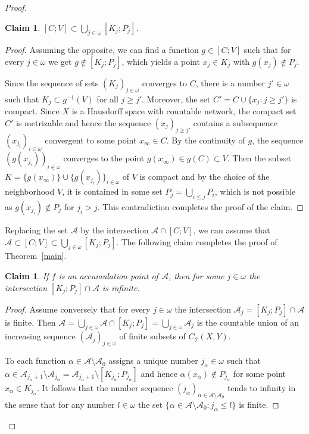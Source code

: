 \documentclass{amsart}
\newtheorem{claim}[theorem]{Claim}
\theoremstyle{definition}
\begin{document}
\begin{proof}
\begin{claim}\label{cl1} $[C;V]\subset \bigcup_{j\in{\omega}}[K_j;P_j]$.
\end{claim}

\begin{proof} Assuming the opposite, we can find a function $g\in [C;V]$ such that for every $j\in{\omega}$ we get $g\notin [K_j;P_j]$, which yields a point $x_j\in K_j$ with $g(x_j)\notin P_j$.

Since the sequence of sets $(K_j)_{j\in{\omega}}$ converges to $C$, there is a number $j'\in{\omega}$ such that $K_j\subset g^{-1}(V)$ for all $j\ge j'$. Moreover, the set $C'=C\cup\{x_j:j\ge j'\}$ is compact. Since $X$ is a Hausdorff space with countable network, the compact set $C'$ is metrizable and hence the sequence $(x_j)_{j\ge j'}$ contains a subsequence $(x_{j_i})_{i\in{\omega}}$ convergent to some point $x_\infty\in C$. By the continuity of $g$, the sequence $(g(x_{j_i}))_{i\in{\omega}}$ converges to the point $g(x_\infty)\in g(C)\subset V$. Then the subset $K=\{g(x_\infty)\}\cup\{g(x_{j_i})\}_{i\in{\omega}}$ of $V$ is compact and by the choice of the neighborhood $V$, it is contained in some set $P_j=\bigcup_{i\le j}P_{i}$, which is not possible as $g(x_{j_i})\notin P_j$ for $j_i>j$. This contradiction completes the proof of the claim.
\end{proof}

Replacing the set ${\mathcal A}$ by the intersection ${\mathcal A}\cap[C;V]$, we can assume that ${\mathcal A}\subset[C;V]\subset\bigcup_{j\in{\omega}}[K_j;P_j]$. The following claim completes the proof of Theorem~\ref{main}.

\begin{claim}\label{cl2} If $f$ is an accumulation point of ${\mathcal A}$, then  for some $j\in{\omega}$ the intersection $[K_j;P_j]\cap {\mathcal A}$ is infinite.
\end{claim}

\begin{proof} Assume conversely that for every $j\in{\omega}$ the intersection ${\mathcal A}_j=[K_j;P_j]\cap{\mathcal A}$ is finite.
Then ${\mathcal A}=\bigcup_{j\in{\omega}}{\mathcal A}\cap[K_j;P_j]=\bigcup_{j\in{\omega}}{\mathcal A}_j$ is the countable union of an increasing sequence $({\mathcal A}_j)_{j\in{\omega}}$ of finite subsets of $C_{\mathcal I}(X,Y)$.

To each function $\alpha\in{\mathcal A}\setminus{\mathcal A}_0$ assigns a unique number $j_\alpha\in{\omega}$ such that $\alpha\in{\mathcal A}_{j_\alpha+1}\setminus{\mathcal A}_{j_\alpha}={\mathcal A}_{j_\alpha+1}\setminus[K_{j_\alpha};P_{j_\alpha}]$ and hence $\alpha(x_\alpha)\notin P_{j_\alpha}$ for some point $x_\alpha\in K_{j_\alpha}$.
It follows that the number sequence $(j_\alpha)_{\alpha\in{\mathcal A}\setminus{\mathcal A}_0}$ tends to infinity in the sense that for any number $l\in{\omega}$ the set $\{\alpha\in{\mathcal A}\setminus{\mathcal A}_0:j_\alpha\le l\}$ is finite.


\end{proof}
\end{proof}
\end{document}

